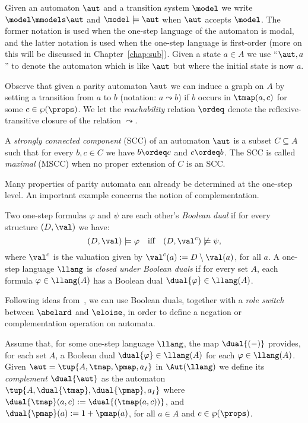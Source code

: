 Given an automaton $\aut$ and a transition system $\model$ we write $\model \mmodels \aut$ and $\model \models \aut$ when $\aut$ accepts $\model$. The former notation is used when the one-step language of the automaton is modal, and the latter notation is used when the one-step language is first-order (more on this will be discussed in Chapter~\ref{chap:sub}). Given a state $a \in A$ we use ``$\aut,a$'' to denote the automaton which is like $\aut$ but where the initial state is now $a$.


\begin{definition}\label{def:autgraph}
Observe that given a parity automaton $\aut$ we can induce a graph on $A$ by setting a transition from $a$ to $b$ (notation: $a \leadsto b$) if $b$ occurs in $\tmap(a,c)$ for some $c \in \wp(\props)$.
We let the \emph{reachability} relation $\ordeq$ denote the reflexive-transitive
closure of the relation $\leadsto$.

A \emph{strongly connected component} (SCC)
of an automaton $\aut$ is a subset $C\subseteq A$ such that for every $b,c \in C$ we
have $b \ordeq c$ and $c \ordeq b$. 
The SCC is called \emph{maximal} (MSCC) when no proper extension of $C$
is an SCC.
\end{definition}

Many properties of parity automata can already be determined at the one-step level.
An important example concerns the notion of complementation.


\begin{definition}
\label{d:bdual1}
Two one-step formulas $\varphi$ and $\psi$ are each other's \emph{Boolean dual}
if for every structure $(D,\val)$ we have:
\[
(D,\val) \models \varphi \quad\text{iff}\quad (D,\val^{c}) \not\models \psi,
\]
where $\val^{c}$ is the valuation given by $\val^{c}(a) \mathrel{:=} D
\setminus \val(a)$, for all $a$.
%
A one-step language $\llang$ is \emph{closed under Boolean duals} if for every
set $A$, each formula $\varphi \in \llang(A)$ has a Boolean dual $\dual{\varphi}
\in \llang(A)$.
\end{definition}

Following ideas from~\cite{Muller1987,DBLP:conf/calco/KissigV09}, we can use Boolean duals, together with a
\emph{role switch} between $\abelard$ and $\eloise$, in order to define a
negation or complementation operation on automata.

\begin{definition}
\label{d:caut}
Assume that, for some one-step language $\llang$, the map $\dual{(-)}$
provides, for each set $A$, a Boolean dual $\dual{\varphi} \in \llang(A)$ for each
$\varphi \in \llang(A)$.
Given $\aut = \tup{A,\tmap,\pmap,a_I}$ in $\Aut(\llang)$ we define its
\emph{complement} $\dual{\aut}$ as the automaton
$\tup{A,\dual{\tmap},\dual{\pmap},a_I}$
where $\dual{\tmap}(a,c) := \dual{(\tmap(a,c))}$, and $\dual{\pmap}(a)
:= 1 + \pmap(a)$, for all $a \in A$ and $c \in \wp(\props)$.
\end{definition}

